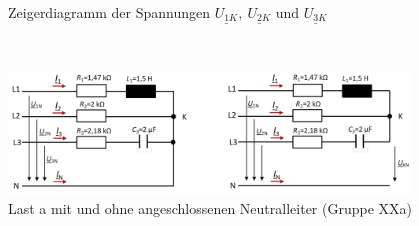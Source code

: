 \begin{enumerate}[label=\alph*)]
\begin{figure}[h!]
\begin{center}
  \end{center}
  \caption{Zeigerdiagramm der Spannungen $\underline{U_{1K}},\ \underline{U_{2K}} \text{ und } \underline{U_{3K}}$}
\end{figure}

\pagebreak	
\ 
  \begin{figure}[h!]
    \begin{center}
      \includegraphics[width=0.95\textwidth]{img/img2.6.1.png}
    \end{center}
    \caption{Last a mit und ohne angeschlossenen Neutralleiter (Gruppe XXa)}\label{img2.6.1}
  \end{figure}
  
\end{enumerate}
